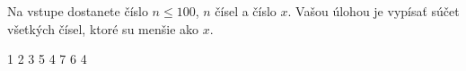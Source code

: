 




Na vstupe dostanete číslo $n \leq 100$, $n$ čísel a číslo $x$. Vašou úlohou je vypísať súčet všetkých čísel, ktoré su menšie ako $x$.

1 2 3 5 4 7 6
4
\koniec


